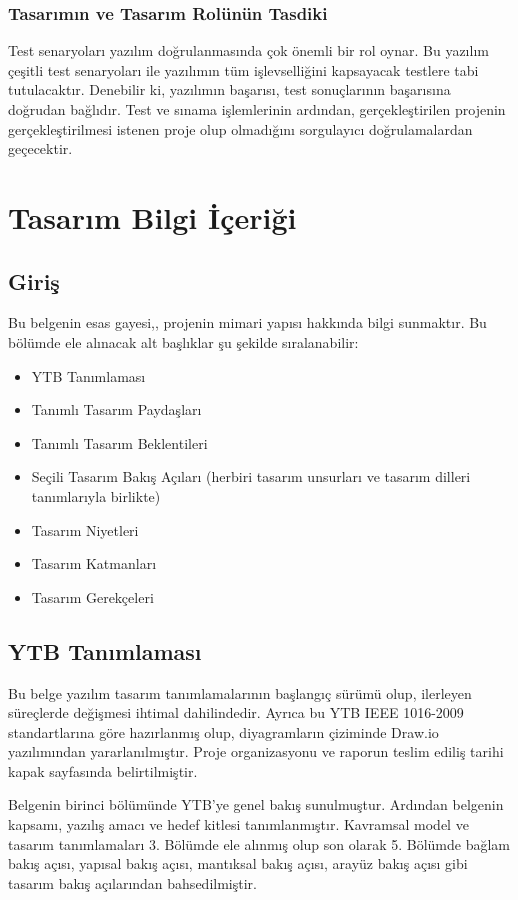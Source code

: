 \documentclass[12pt,a4paper]{article}
\begin{document}
   \subsubsection{Tasarımın ve Tasarım Rolünün Tasdiki}
   Test senaryoları yazılım doğrulanmasında çok önemli bir rol oynar. Bu yazılım çeşitli test senaryoları ile yazılımın tüm işlevselliğini kapsayacak testlere tabi tutulacaktır. Denebilir ki, yazılımın başarısı, test sonuçlarının başarısına doğrudan bağlıdır. Test ve sınama işlemlerinin ardından, gerçekleştirilen projenin gerçekleştirilmesi istenen proje olup olmadığını sorgulayıcı doğrulamalardan geçecektir.

   \section{Tasarım Bilgi İçeriği}
   \subsection{Giriş}
   Bu belgenin esas gayesi,, projenin mimari yapısı hakkında bilgi sunmaktır. Bu bölümde ele alınacak alt başlıklar şu şekilde sıralanabilir:
   \begin{itemize}
      \item YTB Tanımlaması
      \item Tanımlı Tasarım Paydaşları
      \item Tanımlı Tasarım Beklentileri
      \item Seçili Tasarım Bakış Açıları (herbiri tasarım unsurları ve tasarım dilleri tanımlarıyla birlikte)
      \item Tasarım Niyetleri
      \item Tasarım Katmanları
      \item Tasarım Gerekçeleri
   \end{itemize}

   \subsection{YTB Tanımlaması}
   Bu belge yazılım tasarım tanımlamalarının başlangıç sürümü olup, ilerleyen süreçlerde değişmesi ihtimal dahilindedir. Ayrıca bu YTB IEEE 1016-2009 standartlarına göre hazırlanmış olup, diyagramların çiziminde Draw.io yazılımından yararlanılmıştır. Proje organizasyonu ve raporun teslim ediliş tarihi kapak sayfasında belirtilmiştir.

   Belgenin birinci bölümünde YTB'ye genel bakış sunulmuştur. Ardından belgenin kapsamı, yazılış amacı ve hedef kitlesi tanımlanmıştır. Kavramsal model ve tasarım tanımlamaları 3. Bölümde ele alınmış olup son olarak 5. Bölümde bağlam bakış açısı, yapısal bakış açısı, mantıksal bakış açısı, arayüz bakış açısı gibi tasarım bakış açılarından bahsedilmiştir.
\end{document}
